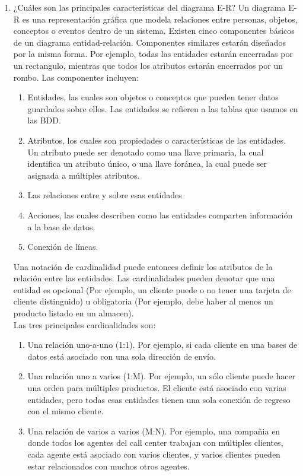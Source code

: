 \documentclass{article}
\begin{document}
\begin{enumerate}
    \item ¿Cuáles son las principales características del diagrama E-R?
    Un diagrama E-R es una representación gráfica que modela relaciones entre personas, objetos, conceptos o eventos dentro de un sistema.
    Existen cinco componentes básicos de un diagrama entidad-relación.
    Componentes similares estarán diseñados por la misma forma. Por ejemplo, todas las entidades estarán encerradas por un rectangulo, mientras que todos los atributos estarán encerrados por un rombo. Las componentes incluyen:\\
    \begin{enumerate}
        \item Entidades, las cuales son objetos o conceptos que pueden tener datos guardados sobre ellos. Las entidades se refieren a las tablas que usamos en las BDD.
        \item Atributos, los cuales son propiedades o características de las entidades. Un atributo puede ser denotado como una llave primaria, la cual identifica un atributo único, o una llave foránea, la cual puede ser asignada a múltiples atributos.
        \item Las relaciones entre y sobre esas entidades
        \item Acciones, las cuales describen como las entidades comparten información a la base de datos.
        \item Conexión de líneas.
    \end{enumerate}
    Una notación de cardinalidad puede entonces definir los atributos de la relación entre las entidades. Las cardinalidades pueden denotar que una entidad es opcional (Por ejemplo, un cliente puede o no tener una tarjeta de cliente distinguido) u obligatoria (Por ejemplo, debe haber al menos un producto listado en un almacen).\\
    Las tres principales cardinalidades son:
    \begin{enumerate}
        \item Una relación uno-a-uno (1:1). Por ejemplo, si cada cliente en una bases de datos está asociado con una sola dirección de envío.
        \item Una relación uno a varios (1:M). Por ejemplo, un sólo cliente puede hacer una orden para múltiples productos. El cliente está asociado con varias entidades, pero todas esas entidades tienen una sola conexión de regreso con el mismo cliente.
        \item Una relación de varios a varios (M:N). Por ejemplo, una compañia en donde todos los agentes del call center trabajan con múltiples clientes, cada agente está asociado con varios clientes, y varios clientes pueden estar relacionados con muchos otros agentes.
    \end{enumerate}
    

\end{enumerate}
\end{document}
